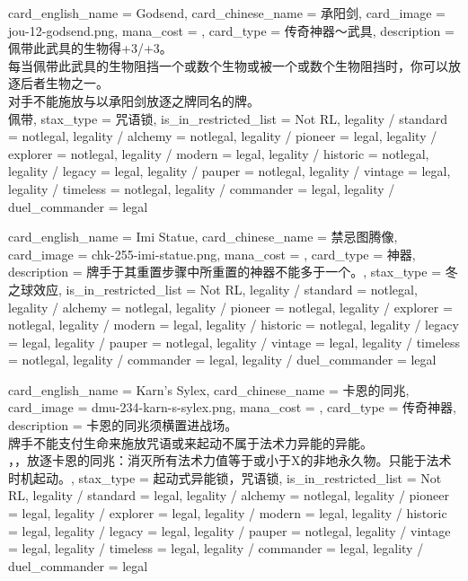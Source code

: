 \documentclass[lang = cn, color = black, 10pt]{AllThatStax}
\begin{document}
\card
{
	card_english_name = {Godsend},
	card_chinese_name = {承阳剑},
	card_image = jou-12-godsend.png,
	mana_cost = ,
	card_type = 传奇神器～武具,
	description = {佩带此武具的生物得+3/+3。\\
		每当佩带此武具的生物阻挡一个或数个生物或被一个或数个生物阻挡时，你可以放逐后者生物之一。\\
		对手不能施放与以承阳剑放逐之牌同名的牌。\\
		佩带},
	stax_type = 咒语锁,
	is_in_restricted_list = Not RL,
	legality / standard = notlegal,
	legality / alchemy = notlegal,
	legality / pioneer = legal,
	legality / explorer = notlegal,
	legality / modern = legal,
	legality / historic = notlegal,
	legality / legacy = legal,
	legality / pauper = notlegal,
	legality / vintage = legal,
	legality / timeless = notlegal,
	legality / commander = legal,
	legality / duel_commander = legal
}

\card
{
	card_english_name = {Imi Statue},
	card_chinese_name = {禁忌图腾像},
	card_image = chk-255-imi-statue.png,
	mana_cost = ,
	card_type = 神器,
	description = {牌手于其重置步骤中所重置的神器不能多于一个。},
	stax_type = 冬之球效应,
	is_in_restricted_list = Not RL,
	legality / standard = notlegal,
	legality / alchemy = notlegal,
	legality / pioneer = notlegal,
	legality / explorer = notlegal,
	legality / modern = legal,
	legality / historic = notlegal,
	legality / legacy = legal,
	legality / pauper = notlegal,
	legality / vintage = legal,
	legality / timeless = notlegal,
	legality / commander = legal,
	legality / duel_commander = legal
}

\card
{
	card_english_name = {Karn's Sylex},
	card_chinese_name = {卡恩的同兆},
	card_image = dmu-234-karn-s-sylex.png,
	mana_cost = ,
	card_type = 传奇神器,
	description = {卡恩的同兆须横置进战场。\\
		牌手不能支付生命来施放咒语或来起动不属于法术力异能的异能。\\
		，，放逐卡恩的同兆：消灭所有法术力值等于或小于X的非地永久物。只能于法术时机起动。},
	stax_type = 起动式异能锁，咒语锁,
	is_in_restricted_list = Not RL,
	legality / standard = legal,
	legality / alchemy = notlegal,
	legality / pioneer = legal,
	legality / explorer = legal,
	legality / modern = legal,
	legality / historic = legal,
	legality / legacy = legal,
	legality / pauper = notlegal,
	legality / vintage = legal,
	legality / timeless = legal,
	legality / commander = legal,
	legality / duel_commander = legal
}
\end{document}

